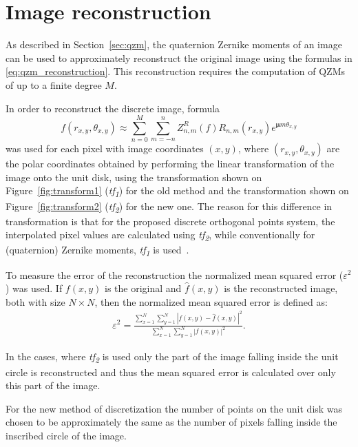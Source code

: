\section{Image reconstruction}
As described in Section~\ref{sec:qzm}, the quaternion Zernike moments of an image can be used to approximately reconstruct the original image using the formulas in \eqref{eq:qzm_reconstruction}. This reconstruction requires the computation of QZMs of up to a finite degree $M$.

In order to reconstruct the discrete image, formula 
$$
f(r_{x,y},\theta_{x,y}) \approx \sum_{n=0}^{M}\sum_{m=-n}^{n}Z_{n,m}^R(f)R_{n,m}(r_{x,y})e^{\bm{\mu}m\theta_{x,y}}
$$
was used for each pixel with image coordinates $(x,y)$, where $(r_{x,y},\theta_{x,y})$ are the polar coordinates obtained by performing the linear transformation of the image onto the unit disk, using the transformation shown on Figure~\ref{fig:transform1} (\textit{tf\textsubscript{1}}) for the old method and the transformation shown on Figure~\ref{fig:transform2} (\textit{tf\textsubscript{2}}) for the new one. The reason for this difference in transformation is that for the proposed discrete orthogonal points system, the interpolated pixel values are calculated using \textit{tf\textsubscript{2}}, while conventionally for (quaternion) Zernike moments, \textit{tf\textsubscript{1}} is used~\cite{qzmi}.

To measure the error of the reconstruction the normalized mean squared error ($\varepsilon^2$) was used. If $f(x,y)$ is the original and $\widehat{f}(x,y)$ is the reconstructed image, both with size $N \times N$, then the normalized mean squared error is defined as:
\begin{gather*}
    \varepsilon^2 = \frac{\displaystyle \sum_{x=1}^N\sum_{y=1}^N \left|f(x,y) - \widehat{f}(x,y)\right|^2}{\displaystyle \sum_{x=1}^N\sum_{y=1}^N \left|f(x,y)\right|^2}.
\end{gather*}

In the cases, where \textit{tf\textsubscript{2}} is used only the part of the image falling inside the unit circle is reconstructed and thus the mean squared error is calculated over only this part of the image.

For the new method of discretization the number of points on the unit disk was chosen to be approximately the same as the number of pixels falling inside the inscribed circle of the image. 

